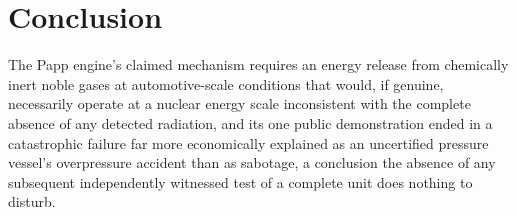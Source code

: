 \documentclass[11pt]{article}
\begin{document}
\section{Conclusion}

The Papp engine's claimed mechanism requires an energy release from chemically inert noble gases at automotive-scale conditions that would, if genuine, necessarily operate at a nuclear energy scale inconsistent with the complete absence of any detected radiation, and its one public demonstration ended in a catastrophic failure far more economically explained as an uncertified pressure vessel's overpressure accident than as sabotage, a conclusion the absence of any subsequent independently witnessed test of a complete unit does nothing to disturb.
\end{document}
